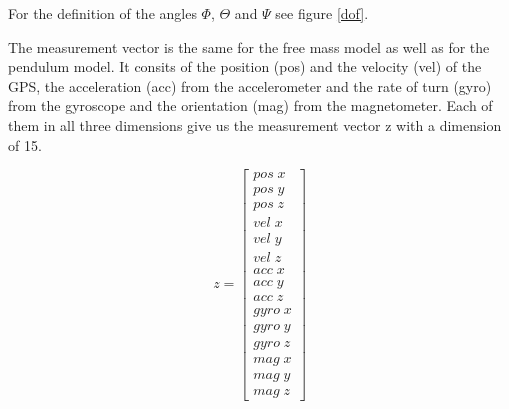 For the definition of the angles $\Phi$, $\Theta$ and $\Psi$ see figure \ref{dof}.

 The measurement vector is the same for the free mass model as well as for the pendulum model. It consits of the position (pos) and the velocity (vel) of the GPS, the acceleration (acc) from the accelerometer and the rate of turn (gyro) from the gyroscope and the orientation (mag) from the magnetometer. Each of them in all three dimensions give us the measurement vector z with a dimension of 15.
 
\begin{equation}
 z= \begin{bmatrix}
  pos\;x \\
  pos\;y \\
  pos\;z \\
  vel\;x \\
  vel\;y \\
  vel\;z \\
  acc\;x \\
  acc\;y \\
  acc\;z \\
  gyro\;x \\
  gyro\;y \\
  gyro\;z \\
  mag\;x \\
  mag\;y \\
  mag\;z
 \end{bmatrix}
\end{equation}



